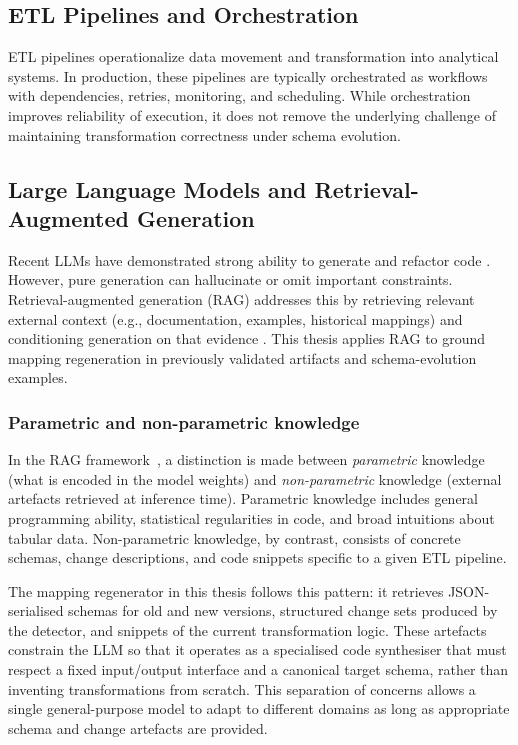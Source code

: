 \subsection{ETL Pipelines and Orchestration}

ETL pipelines operationalize data movement and transformation into analytical systems. In production, these pipelines are typically orchestrated as workflows with dependencies, retries, monitoring, and scheduling. While orchestration improves reliability of execution, it does not remove the underlying challenge of maintaining transformation correctness under schema evolution.

\subsection{Large Language Models and Retrieval-Augmented Generation}

Recent LLMs have demonstrated strong ability to generate and refactor code \cite{chen2021evaluating}. However, pure generation can hallucinate or omit important constraints. Retrieval-augmented generation (RAG) addresses this by retrieving relevant external context (e.g., documentation, examples, historical mappings) and conditioning generation on that evidence \cite{lewis2020retrieval}. This thesis applies RAG to ground mapping regeneration in previously validated artifacts and schema-evolution examples.

\subsubsection{Parametric and non-parametric knowledge}

In the RAG framework~\cite{lewis2020retrieval}, a distinction is made between \emph{parametric} knowledge (what is encoded in the model weights) and \emph{non-parametric} knowledge (external artefacts retrieved at inference time). Parametric knowledge includes general programming ability, statistical regularities in code, and broad intuitions about tabular data. Non-parametric knowledge, by contrast, consists of concrete schemas, change descriptions, and code snippets specific to a given ETL pipeline.

The mapping regenerator in this thesis follows this pattern: it retrieves JSON-serialised schemas for old and new versions, structured change sets produced by the detector, and snippets of the current transformation logic. These artefacts constrain the LLM so that it operates as a specialised code synthesiser that must respect a fixed input/output interface and a canonical target schema, rather than inventing transformations from scratch. This separation of concerns allows a single general-purpose model to adapt to different domains as long as appropriate schema and change artefacts are provided.

